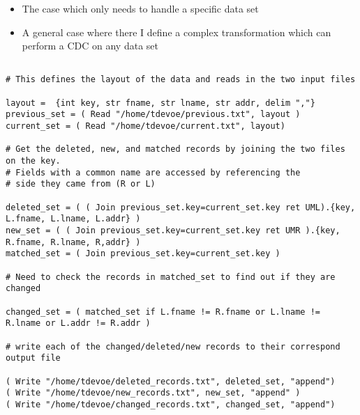 \documentclass{article}
\begin{document}
\begin{itemize}

\item The case which only needs to handle a specific data set

\item A general case where there I define a complex transformation which can perform a CDC on any data set

\end {itemize}

\begin{lstlisting}[title=Specific Case]

# This defines the layout of the data and reads in the two input files

layout =  {int key, str fname, str lname, str addr, delim ","}
previous_set = ( Read "/home/tdevoe/previous.txt", layout )
current_set = ( Read "/home/tdevoe/current.txt", layout)

# Get the deleted, new, and matched records by joining the two files on the key. 
# Fields with a common name are accessed by referencing the
# side they came from (R or L)

deleted_set = ( ( Join previous_set.key=current_set.key ret UML).{key, L.fname, L.lname, L.addr} )
new_set = ( ( Join previous_set.key=current_set.key ret UMR ).{key, R.fname, R.lname, R,addr} )
matched_set = ( Join previous_set.key=current_set.key )

# Need to check the records in matched_set to find out if they are changed

changed_set = ( matched_set if L.fname != R.fname or L.lname != R.lname or L.addr != R.addr )

# write each of the changed/deleted/new records to their correspond output file

( Write "/home/tdevoe/deleted_records.txt", deleted_set, "append")
( Write "/home/tdevoe/new_records.txt", new_set, "append" )
( Write "/home/tdevoe/changed_records.txt", changed_set, "append")
\end{lstlisting}
\end{document}
